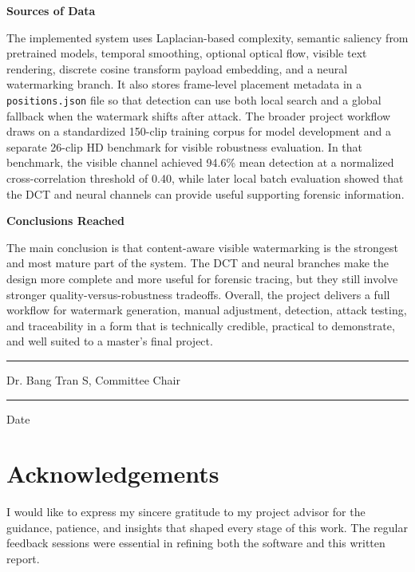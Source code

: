 \documentclass[12pt,oneside]{report}
\newcommand{\CommitteeChair}{Dr. Bang Tran S}
\begin{document}
\vspace{0.3in}
\noindent\textbf{Sources of Data}

The implemented system uses Laplacian-based complexity, semantic saliency from pretrained models, temporal smoothing, optional optical flow, visible text rendering, discrete cosine transform payload embedding, and a neural watermarking branch. It also stores frame-level placement metadata in a \texttt{positions.json} file so that detection can use both local search and a global fallback when the watermark shifts after attack. The broader project workflow draws on a standardized 150-clip training corpus for model development and a separate 26-clip HD benchmark for visible robustness evaluation. In that benchmark, the visible channel achieved 94.6\% mean detection at a normalized cross-correlation threshold of 0.40, while later local batch evaluation showed that the DCT and neural channels can provide useful supporting forensic information.

\vspace{0.3in}
\noindent\textbf{Conclusions Reached}

The main conclusion is that content-aware visible watermarking is the strongest and most mature part of the system. The DCT and neural branches make the design more complete and more useful for forensic tracing, but they still involve stronger quality-versus-robustness tradeoffs. Overall, the project delivers a full workflow for watermark generation, manual adjustment, detection, attack testing, and traceability in a form that is technically credible, practical to demonstrate, and well suited to a master's final project.

\vspace{0.8in}
\noindent\hfill\rule{2.8in}{0.4pt}

\noindent\hfill\CommitteeChair, Committee Chair

\vspace{0.6in}
\noindent\hfill\rule{2.0in}{0.4pt}

\noindent\hfill Date

\clearpage
\chapter*{Acknowledgements}
I would like to express my sincere gratitude to my project advisor for the guidance, patience, and insights that shaped every stage of this work. The regular feedback sessions were essential in refining both the software and this written report.
\end{document}
